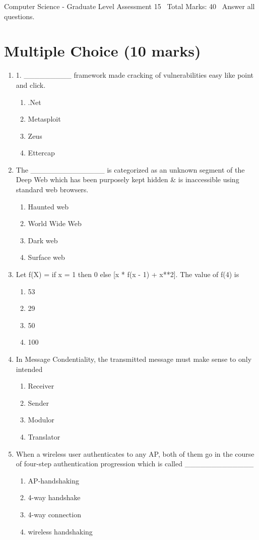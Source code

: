 \documentclass[12pt]{article}
\begin{document}
\begin{center}
Computer Science - Graduate Level Assessment 15 \
Total Marks: 40 \
Answer all questions.
\end{center}

\section*{Multiple Choice (10 marks)}
\begin{enumerate}[label=\arabic*.]
\item 1. \_\_\_\_\_\_\_\_\_ framework made cracking of vulnerabilities easy like point and click.
\begin{enumerate}[label=(\alph*)]
    \item .Net
    \item Metasploit
    \item Zeus
    \item Ettercap
\end{enumerate}
\item The \_\_\_\_\_\_\_\_\_\_\_\_\_\_ is categorized as an unknown segment of the Deep Web which has been purposely kept hidden \& is inaccessible using standard web browsers.
\begin{enumerate}[label=(\alph*)]
    \item Haunted web
    \item World Wide Web
    \item Dark web
    \item Surface web
\end{enumerate}
\item Let f(X) = if x = 1 then 0 else [x * f(x - 1) + x**2]. The value of f(4) is
\begin{enumerate}[label=(\alph*)]
    \item 53
    \item 29
    \item 50
    \item 100
\end{enumerate}
\item In Message Condentiality, the transmitted message must make sense to only intended
\begin{enumerate}[label=(\alph*)]
    \item Receiver
    \item Sender
    \item Modulor
    \item Translator
\end{enumerate}
\item When a wireless user authenticates to any AP, both of them go in the course of four-step authentication progression which is called \_\_\_\_\_\_\_\_\_\_\_\_\_
\begin{enumerate}[label=(\alph*)]
    \item AP-handshaking
    \item 4-way handshake
    \item 4-way connection
    \item wireless handshaking
\end{enumerate}
\end{enumerate}
\end{document}
